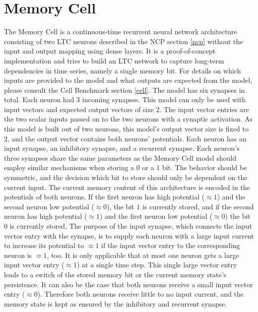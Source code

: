 \documentclass[draft,final]{vutinfth} %
\begin{document}
    \section{Memory Cell} \label{memory_cell}
    The Memory Cell is a continuous-time recurrent neural network architecture consisting of two LTC neurons described in the NCP section \ref{ncp} without the input and output mapping using dense layers.
    It is a proof-of-concept implementation and tries to build an LTC network \cite{LTCNetworks} to capture long-term dependencies in time series, namely a single memory bit.
    For details on which inputs are provided to the model and what outputs are expected from the model, please consult the Cell Benchmark section \ref{cell}.
    The model has six synapses in total. Each neuron had $3$ incoming synapses.
    This model can only be used with input vectors and expected output vectors of size $2$.
    The input vector entries are the two scalar inputs passed on to the two neurons with a synaptic activation.
    As this model is built out of two neurons, this model's output vector size is fixed to $2$, and the output vector contains both neurons' potentials.
    Each neuron has an input synapse, an inhibitory synapse, and a recurrent synapse. 
    Each neuron's three synapses share the same parameters as the Memory Cell model should employ similar mechanisms when storing a $0$ or a $1$ bit.
    The behavior should be symmetric, and the decision which bit to store should only be dependent on the current input.
    The current memory content of this architecture is encoded in the potentials of both neurons.
    If the first neuron has high potential ($\approx 1$) and the second neuron low potential ($\approx 0$), the bit $1$ is currently stored, and if the second neuron has high potential ($\approx 1$) and the first neuron low potential ($\approx 0$) the bit $0$ is currently stored.
    The purpose of the input synapse, which connects the input vector entry with the synapse, is to supply each neuron with a large input current to increase its potential to $\approx 1$ if the input vector entry to the corresponding neuron is $\approx 1$, too.
    It is only applicable that at most one neuron gets a large input vector entry ($\approx 1$) at a single time step.
    This single large vector entry leads to a switch of the stored memory bit or the current memory state's persistence.
    It can also be the case that both neurons receive a small input vector entry ($\approx 0$). Therefore both neurons receive little to no input current, and the memory state is kept as ensured by the inhibitory and recurrent synapse.
\end{document}
